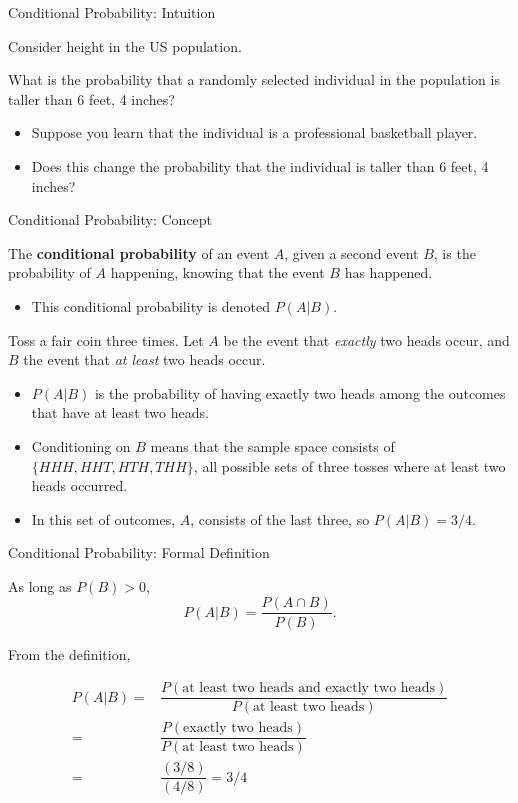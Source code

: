 \documentclass[ignorenonframetext,aspectratio=169]{beamer}
\providecommand{\tightlist}{%
  \setlength{\itemsep}{0pt}\setlength{\parskip}{0pt}}
\begin{document}
\begin{frame}{Conditional Probability: Intuition}

Consider height in the US population.

What is the probability that a randomly selected individual in the
population is taller than 6 feet, 4 inches?

\begin{itemize}
\item
  Suppose you learn that the individual is a professional basketball
  player.
\item
  Does this change the probability that the individual is taller than 6
  feet, 4 inches?
\end{itemize}

\end{frame}

\begin{frame}{Conditional Probability: Concept}

The \textbf{conditional probability} of an event \(A\), given a second
event \(B\), is the probability of \(A\) happening, knowing that the
event \(B\) has happened.

\begin{itemize}
\tightlist
\item
  This conditional probability is denoted \(P(A|B)\).
\end{itemize}

Toss a fair coin three times. Let \(A\) be the event that \emph{exactly}
two heads occur, and \(B\) the event that \emph{at least} two heads
occur.

\begin{itemize}
\item
  \(P(A|B)\) is the probability of having exactly two heads among the
  outcomes that have at least two heads.
\item
  Conditioning on \(B\) means that the sample space consists of
  \(\{HHH, HHT, HTH, THH\}\), all possible sets of three tosses where at
  least two heads occurred.
\item
  In this set of outcomes, \(A\), consists of the last three, so
  \(P(A|B) = 3/4\).
\end{itemize}

\end{frame}

\begin{frame}{Conditional Probability: Formal Definition}

As long as \(P(B) > 0\), \[P(A|B) = \dfrac{P(A \cap B)}{P(B)}. \]

From the definition,

\begin{align*}
P(A|B) =& \dfrac{P(\text{at least two heads and exactly two heads})}{P(\text{at least two heads})} \\
=& \dfrac{P(\text{exactly two heads})}{P(\text{at least two heads})} \\
=& \dfrac{(3/8)}{(4/8)} = 3/4
\end{align*}

\end{frame}
\end{document}
